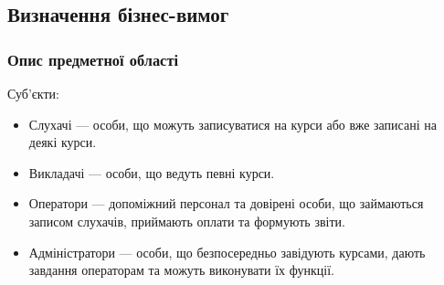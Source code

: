 \subsection{Визначення бізнес-вимог}
\subsubsection{Опис предметної області}

Суб'єкти:

\begin{itemize}
\item Слухачі --- особи, що можуть записуватися на курси або вже записані на деякі курси.
\item Викладачі --- особи, що ведуть певні курси.
\item Оператори --- допоміжний персонал та довірені особи, що займаються записом слухачів, приймають оплати та формують звіти.
\item Адміністратори --- особи, що безпосередньо завідують курсами, дають завдання операторам та можуть виконувати їх функції.
\end{itemize}

